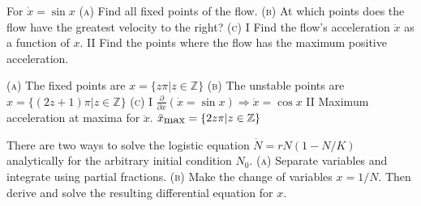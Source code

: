 \documentclass[11pt,answers]{exam}
\begin{document}
\begin{questions}

\addtocounter{question}{22}

\item For $\dot{x} = \sin{x}$
\newline\textsc{(a)} Find all fixed points of the flow.
\newline\textsc{(b)} At which points does the flow have the greatest velocity to the right?
\newline\textsc{(c)} \textrm{I} Find the flow's acceleration $\ddot{x}$ as a function of $x$.
\newline \hspace*{1.1em} \textrm{II} Find the points where the flow has the maximum positive acceleration.

\begin{solution}
\newline\textsc{(a)} The fixed points are $x = \{z\pi | z \in \mathbb{Z}\}$
\newline\newline\textsc{(b)} The unstable points are $x = \{(2z + 1)\pi | z\in \mathbb{Z}\}$
\newline\newline\textsc{(c)} \textrm{I} \hspace{3em} $\displaystyle \frac{\partial}{\partial{x}}\left(\dot{x} = \sin{x} \right) \Rightarrow \ddot{x} = \cos{x}$
\newline \hspace*{1.1em} \textrm{II} \hspace{3em} Maximum acceleration at maxima for $\ddot{x}$.  $\ddot{x}_{\hbox{max}} = \{2z\pi | z \in \mathbb{Z}\}$
\end{solution}

\item There are two ways to solve the logistic equation $\dot{N} = rN(1 - N/K)$ analytically for the arbitrary initial condition $N_0$.
\newline\textsc{(a)} Separate variables and integrate using partial fractions.
\newline\textsc{(b)} Make the change of variables $x = 1/N$.  Then derive and solve the resulting differential equation for $x$.


\end{questions}
\end{document}
